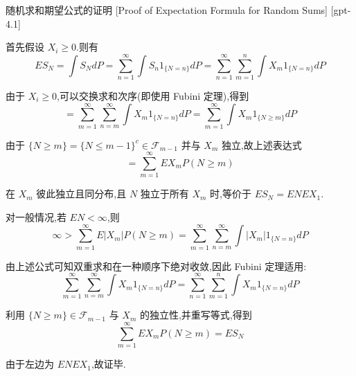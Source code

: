 \documentclass[UTF8]{ctexart}
\begin{document}
    
    
    \begin{prf}
        {随机求和期望公式的证明}
        [Proof of Expectation Formula for Random Sums]
        [gpt-4.1]
        
首先假设 $X_{i} \geq 0$.则有
\[
E S_{N} = \int S_{N} dP = \sum_{n=1}^{\infty} \int S_{n} 1_{\{ N = n \}} dP = \sum_{n=1}^{\infty} \sum_{m=1}^{n} \int X_{m} 1_{\{ N = n \}} dP
\]

由于 $X_{i} \geq 0$,可以交换求和次序(即使用 Fubini 定理),得到
\[
= \sum_{m=1}^{\infty} \sum_{n=m}^{\infty} \int X_{m} 1_{\{ N = n \}} dP = \sum_{m=1}^{\infty} \int X_{m} 1_{\{ N \geq m \}} dP
\]

由于 $\{ N \ge m \} = \{ N \le m - 1 \}^{c} \in \mathcal{F}_{m-1}$ 并与 $X_{m}$ 独立,故上述表达式
\[
= \sum_{m=1}^{\infty} E X_{m} P(N \geq m)
\]

在 $X_m$ 彼此独立且同分布,且 $N$ 独立于所有 $X_m$ 时,等价于 $E S_{N} = E N E X_{1}$.

对一般情况,若 $E N < \infty$,则
\[
\infty > \sum_{m=1}^{\infty} E | X_{m} | P(N \geq m) = \sum_{m=1}^{\infty} \sum_{n=m}^{\infty} \int | X_{m} | 1_{\{ N = n \}} dP
\]

由上述公式可知双重求和在一种顺序下绝对收敛,因此 Fubini 定理适用:
\[
\sum_{m=1}^{\infty} \sum_{n=m}^{\infty} \int X_{m} 1_{\{ N = n \}} dP = \sum_{n=1}^{\infty} \sum_{m=1}^{n} \int X_{m} 1_{\{ N = n \}} dP
\]

利用 $\{ N \geq m \} \in \mathcal{F}_{m-1}$ 与 $X_{m}$ 的独立性,并重写等式,得到
\[
\sum_{m=1}^{\infty} E X_{m} P(N \geq m) = E S_{N}
\]

由于左边为 $E N E X_{1}$,故证毕.

    \end{prf}
    
    
    
\end{document}
